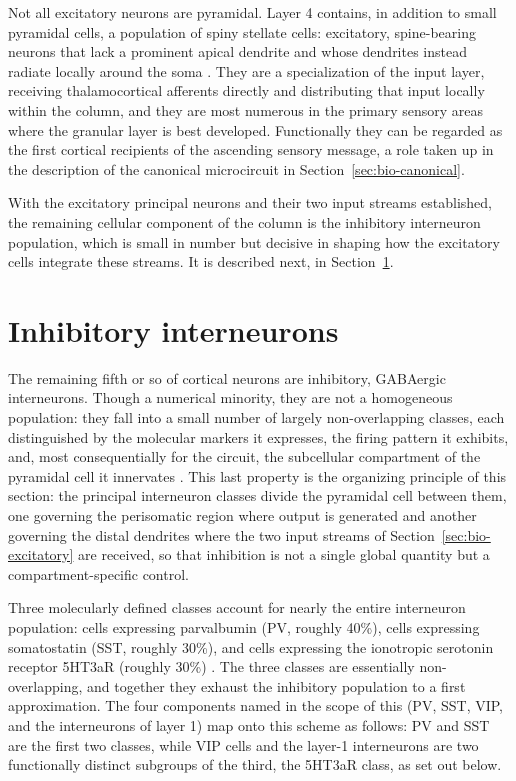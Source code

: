 Not all excitatory neurons are pyramidal. Layer 4 contains, in addition to small pyramidal cells, a population of spiny stellate cells:
 excitatory, spine-bearing neurons that lack a prominent apical dendrite and whose dendrites instead radiate locally around the soma 
 \parencite{white1989, douglas2004}. They are a specialization of the input layer, receiving thalamocortical afferents directly and 
 distributing that input locally within the column, and they are most numerous in the primary sensory areas where the granular layer 
 is best developed. Functionally they can be regarded as the first cortical recipients of the ascending sensory message, a role taken 
 up in the description of the canonical microcircuit in Section~\ref{sec:bio-canonical}.

With the excitatory principal neurons and their two input streams established, the remaining cellular component of the column is the 
inhibitory interneuron population, which is small in number but decisive in shaping how the excitatory cells integrate these streams. 
It is described next, in Section~\ref{sec:bio-inhibitory}.

\section{Inhibitory interneurons}
\label{sec:bio-inhibitory}

The remaining fifth or so of cortical neurons are inhibitory, GABAergic interneurons. Though a numerical minority, they are not a 
homogeneous population: they fall into a small number of largely non-overlapping classes, each distinguished by the molecular markers
 it expresses, the firing pattern it exhibits, and, most consequentially for the circuit, the subcellular compartment of the pyramidal 
 cell it innervates \parencite{rudy2011, tremblay2016}. This last property is the organizing principle of this section: the principal 
 interneuron classes divide the pyramidal cell between them, one governing the perisomatic region where output is generated and another 
 governing the distal dendrites where the two input streams of Section~\ref{sec:bio-excitatory} are received, so that inhibition is not 
 a single global quantity but a compartment-specific control.

Three molecularly defined classes account for nearly the entire interneuron population: cells expressing parvalbumin 
(PV, roughly 40\%), cells expressing somatostatin (SST, roughly 30\%), and cells expressing the ionotropic serotonin receptor 
5HT3aR (roughly 30\%) \parencite{rudy2011}. The three classes are essentially non-overlapping, and together they exhaust the 
inhibitory population to a first approximation. The four components named in the scope of this \unitname{} (PV, SST, VIP, and the interneurons of layer 1) map onto this scheme as follows: PV and SST are the first two classes, while VIP cells and the layer-1 
interneurons are two functionally distinct subgroups of the third, the 5HT3aR class, as set out below.

